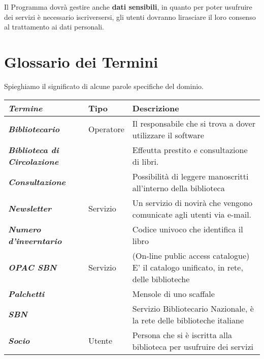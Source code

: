 \documentclass{tstextbook}
\begin{document}
Il Programma dovrà gestire anche \textbf{dati sensibili}, in quanto per poter usufruire dei servizi è necessario iscriversersi, gli utenti dovranno lirasciare il loro consenso al trattamento ai dati personali.\\

\newpage

\section{Glossario dei Termini}
Spieghiamo il significato di alcune parole specifiche del dominio.
\begin{center}
	\begin{tabular}{%
			>{\itshape}p{50mm}%
			>{\sffamily}p{20mm}%
			>{\sffamily}p{80mm}%
		}
		\toprule
		\textbf{\large Termine} & \textbf{\large Tipo} & \textbf{\large Descrizione} \\
		\midrule
		\rowcolor{LightCyan}	
		\textbf{Bibliotecario} & Operatore & Il responsabile che si trova a dover utilizzare il software\\
		\textbf{Biblioteca di Circolazione} & & Effeutta prestito e consultazione di libri.  \\
		\rowcolor{LightCyan}
		\textbf{Consultazione} & &  Possibilità di leggere manoscritti all'interno della biblioteca\\
		\textbf{Newsletter} & Servizio & Un servizio di novirà che vengono comunicate agli utenti via e-mail.\\	
		\rowcolor{LightCyan}	
		\textbf{Numero d'inverntario} & & Codice univoco che identifica il libro\\
		\textbf{OPAC SBN} & Servizio & (On-line public access catalogue) E' il catalogo unificato, in rete, delle biblioteche\\
		\rowcolor{LightCyan}
		\textbf{Palchetti} & & Mensole di uno scaffale\\
		\textbf{SBN} & & Servizio Bibliotecario Nazionale, è la rete delle biblioteche italiane\\
		\rowcolor{LightCyan}
		\textbf{Socio} & Utente & Persona che si è iscritta alla biblioteca per usufruire dei servizi  \\
		
	\end{tabular}
\end{center}



\end{document}
